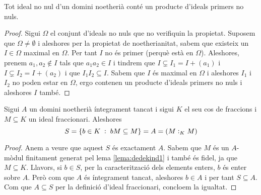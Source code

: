 \documentclass[../../../main.tex]{subfiles}
\begin{document}
\begin{lema}
\label{lema:dedekind2} Tot ideal no nul d'un domini noetherià conté un producte d'ideals primers no nuls.
\end{lema}
\begin{proof}
Sigui $\Omega$ el conjunt d'ideals no nuls que no verifiquin la propietat. Suposem que $\Omega\neq\emptyset$ i aleshores per la propietat de noetherianitat, sabem que existeix un $I\in \Omega$ maximal en $\Omega$. Per tant $I$ no és primer (perquè està en $\Omega$). Aleshores, prenem $a_1,a_2\not\in I$ tals que $a_1a_2\in I$ i tindrem que $I\varsubsetneq I_1 = I+(a_1)$ i $I\varsubsetneq I_2 = I+(a_2)$ i que $I_1I_2\subseteq I$. Sabem que $I$ és maximal en $\Omega$ i aleshores $I_1$ i $I_2$ no poden estar en $\Omega$, ergo contenen un producte d'ideals primers no nuls i aleshores $I$ també.
\end{proof}


\begin{lema}
\label{lema:dedekind3} Sigui $A$ un domini noetherià íntegrament tancat i sigui $K$ el seu cos de fraccions i $M\subseteq K$ un ideal fraccionari. Aleshores
\begin{equation}
    \notag
    S = \{b\in K\;:\;bM\subseteq M\} = A = (M:_KM)
\end{equation}
\end{lema}
\begin{proof}
Anem a veure que aquest $S$ és exactament $A$. Sabem que $M$ és un $A$-mòdul finitament generat pel lema \ref{lema:dedekind1} i també és fidel, ja que $M\subseteq K$. Llavors, si $b\in S$, per la caracterització dels elements enters, $b$ és enter sobre $A$. Però com que $A$ és íntegrament tancat, aleshores $b\in A$ i per tant $S\subseteq A$. Com que $A\subseteq S$ per la definició d'ideal fraccionari, concloem la igualtat.
\end{proof}
\end{document}
